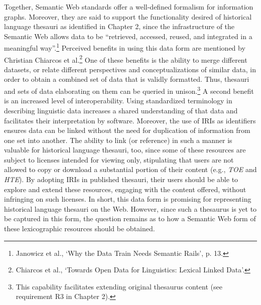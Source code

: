 Together, Semantic Web standards offer a well-defined formalism for information graphs. Moreover, they are said to support the functionality desired of historical language thesauri as identified in Chapter 2, since the infrastructure of the Semantic Web allows data to be ``retrieved, accessed, reused, and integrated in a meaningful way''.\footnote{Janowicz et al., `Why the Data Train Needs Semantic Rails', p. 13.} 
Perceived benefits in using this data form are mentioned by Christian Chiarcos et al.\footnote{Chiarcos et al., `Towards Open Data for Linguistics: Lexical Linked Data'.} One of these benefits is the ability to merge different datasets, or relate different perspectives and conceptualizations of similar data, in order to obtain a combined set of data that is validly formatted. Thus, thesauri and sets of data elaborating on them can be queried in unison.\footnote{This capability facilitates extending original thesaurus content (see requirement R3 in Chapter 2).} A second benefit is an increased level of interoperability. Using standardized terminology in describing linguistic data increases a shared understanding of that data and facilitates their interpretation by software. Moreover, the use of IRIs as identifiers ensures data can be linked without the need for duplication of information from one set into another. The ability to link (or reference) in such a manner is valuable for historical language thesauri, too, since some of these resources are subject to licenses intended for viewing only, stipulating that users are not allowed to copy or download a substantial portion of their content (e.g., \textit{TOE} and \textit{HTE}). By adopting IRIs in published thesauri, their users should be able to explore and extend these resources, engaging with the content offered, without infringing on such licenses. 
In short, this data form is promising for representing historical language thesauri on the Web. However, since such a thesaurus is yet to be captured in this form, the question remains as to how a Semantic Web form of these lexicographic resources should be obtained.

